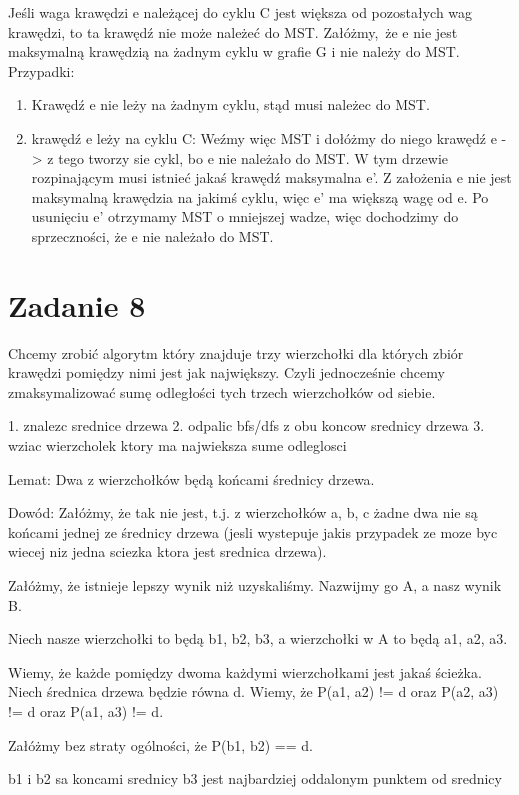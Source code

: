 \documentclass[12pt]{article}
\begin{document}
Jeśli waga krawędzi e należącej do cyklu C jest większa od pozostałych wag krawędzi, to ta krawędź nie może należeć do MST. Załóżmy, że e nie jest maksymalną krawędzią na żadnym cyklu w grafie G i nie należy do MST. Przypadki:
\begin{enumerate}
    \item Krawędź e nie leży na żadnym cyklu, stąd musi należec do MST.
    \item krawędź e leży na cyklu C: Weźmy więc MST i dołóżmy do niego krawędź e -> z tego tworzy sie cykl, bo e nie należało do MST. W tym drzewie rozpinającym musi istnieć jakaś krawędź maksymalna e'. Z założenia e nie jest maksymalną krawędzia na jakimś cyklu, więc e' ma większą wagę od e. Po usunięciu e' otrzymamy MST o mniejszej wadze, więc dochodzimy do sprzeczności, że e nie należało do MST.
\end{enumerate}
\section{Zadanie 8}
Chcemy zrobić algorytm który znajduje trzy wierzchołki dla których zbiór krawędzi pomiędzy nimi jest jak największy.
Czyli jednocześnie chcemy zmaksymalizować sumę odległości tych trzech wierzchołków od siebie.

1. znalezc srednice drzewa 
2. odpalic bfs/dfs z obu koncow srednicy drzewa 
3. wziac wierzcholek ktory ma najwieksza sume odleglosci 


Lemat:
Dwa z wierzchołków będą końcami średnicy drzewa.

Dowód:
Załóżmy, że tak nie jest, t.j. z wierzchołków a, b, c żadne dwa nie są końcami jednej ze średnicy drzewa (jesli wystepuje jakis przypadek ze moze byc wiecej niz jedna sciezka ktora jest srednica drzewa).

Załóżmy, że istnieje lepszy wynik niż uzyskaliśmy. Nazwijmy go A, a nasz wynik B.

Niech nasze wierzchołki to będą b1, b2, b3, a wierzchołki w A to będą a1, a2, a3.

Wiemy, że każde pomiędzy dwoma każdymi wierzchołkami jest jakaś ścieżka. Niech średnica drzewa będzie równa d. Wiemy, że P(a1, a2) != d oraz P(a2, a3) != d oraz P(a1, a3) != d. 


Załóżmy bez straty ogólności, że P(b1, b2) == d.


b1 i b2 sa koncami srednicy
b3 jest najbardziej oddalonym punktem od srednicy 
\end{document}
